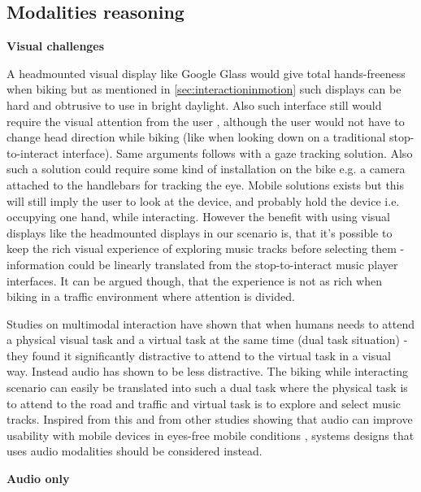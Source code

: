 \subsection{Modalities reasoning}

\textbf{Visual challenges}

A headmounted visual display like Google Glass would give total hands-freeness when biking but as mentioned in \ref{sec:interactioninmotion} such displays can be hard and obtrusive to use in bright daylight. Also such interface still would require the visual attention from the user \cite{geelhoed_safety_2000}, although the user would not have to change head direction while biking (like when looking down on a traditional stop-to-interact interface). Same arguments follows with a gaze tracking solution. Also such a solution could require some kind of installation on the bike e.g. a camera attached to the handlebars for tracking the eye. Mobile solutions exists \cite{mardanbegi_eye-based_2012} but this will still imply the user to look at the device, and probably hold the device i.e. occupying one hand, while interacting. However the benefit with using visual displays like the headmounted displays in our scenario is, that it's possible to keep the rich visual experience of exploring music tracks before selecting them - information could be linearly translated from the stop-to-interact music player interfaces. It can be argued though, that the experience is not as rich when biking in a traffic environment where attention is divided.

Studies on multimodal interaction \cite{zhao_shared_2013} have shown that when humans needs to attend a physical visual task and a virtual task at the same time (dual task situation) - they found it significantly distractive to attend to the virtual task in a visual way. Instead audio has shown to be less distractive. The biking while interacting scenario can easily be translated into such a dual task where the physical task is to attend to the road and traffic and virtual task is to explore and select music tracks. Inspired from this and from other studies showing that audio can improve usability with mobile devices in eyes-free mobile conditions \cite{brewster_multimodaleyes-freeinteraction_2003}, systems designs that uses audio modalities should be considered instead.

\textbf{Audio only}


